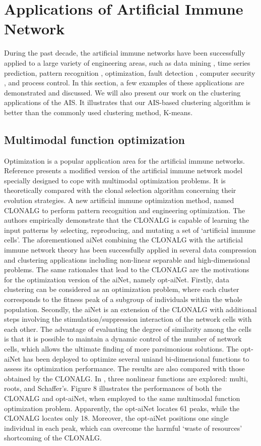 \documentclass{article}
\begin{document}
\section{Applications of Artificial Immune Network}
During the past decade, the artificial immune networks have been successfully applied to a large variety of engineering areas, such as data mining , time series prediction, pattern recognition , optimization, fault detection , computer security , and process control. In this section, a few examples of these applications are demonstrated and discussed. We will also present our work on the clustering applications of the AIS. It illustrates that our AIS-based clustering algorithm is better than the commonly used clustering method, K-means.
\subsection{Multimodal function optimization}
Optimization is a popular application area for the artificial immune networks. Reference presents a modified version of the artificial immune network model specially designed to cope with multimodal optimization problems. It is theoretically compared with the clonal selection algorithm concerning their evolution strategies. A new artificial immune optimization method, named CLONALG to perform pattern recognition and engineering optimization. The authors empirically demonstrate that the CLONALG is capable of learning the input patterns by selecting, reproducing, and mutating a set of ‘artificial immune cells’. 
The aforementioned aiNet combining the CLONALG with the artificial immune network theory has been successfully applied in several data compression and clustering applications including non-linear separable and high-dimensional problems. The same rationales that lead to the CLONALG are the motivations for the optimization version of the aiNet, namely opt-aiNet. Firstly, data clustering can be considered as an optimization problem, where each cluster corresponds to the fitness peak of a subgroup of individuals within the whole population. Secondly, the aiNet is an extension of the CLONALG with additional steps involving the stimulation/suppression interaction of the network cells with each other. The advantage of evaluating the degree of similarity among the cells is that it is possible to maintain a dynamic control of the number of network cells, which allows the ultimate finding of more parsimonious solutions.
The opt-aiNet has been deployed to optimize several uniand bi-dimensional functions to assess its optimization performance. The results are also compared with those obtained by the CLONALG. In , three nonlinear functions are explored: multi, roots, and Schaffer’s. Figure 8 illustrates the performances of both the CLONALG and opt-aiNet, when employed to the same multimodal function optimization problem. Apparently, the opt-aiNet locates 61 peaks, while the CLONALG locates only 18. Moreover, the opt-aiNet positions one single individual in each peak, which can overcome the harmful ‘waste of resources’ shortcoming of the CLONALG. 
\end{document}
